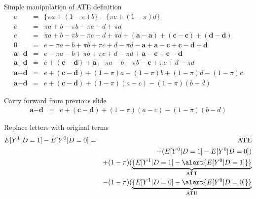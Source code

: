 \documentclass{beamer}
\begin{document}
\begin{frame}[plain]

  \begin{block}{Simple manipulation of ATE definition}
    \begin{eqnarray*}
      e&=&\{\pi{a} + (1-\pi)b\} - \{\pi{c} + (1-\pi)d\}  \\
      e&=&\pi{a} + b - \pi{b} - \pi{c} - d + \pi{d}  \\
      e&=&\pi{a} + b - \pi{b} - \pi{c} - d + \pi{d} + (\textbf{a} - \textbf{a}) + (\textbf{c} - \textbf{c}) + (\textbf{d} - \textbf{d})  \\
      0&=&e-\pi{a} - b + \pi{b} + \pi{c} + d - \pi{d} - \textbf{a} + \textbf{a} - \textbf{c} + \textbf{c} - \textbf{d} + \textbf{d}  \\
      \textbf{a}-\textbf{d}&=&e-\pi{a} - b + \pi{b} + \pi{c} + d - \pi{d}  + \textbf{a} - \textbf{c} + \textbf{c} - \textbf{d}  \\
      \textbf{a}-\textbf{d}&=&e  + (\textbf{c} - \textbf{d}) + \textbf{a}-\pi{a} - b + \pi{b} - \textbf{c} + \pi{c} + d - \pi{d} \\
      \textbf{a}-\textbf{d}&=&e  + (\textbf{c} - \textbf{d}) + (1-\pi)a -(1-\pi)b + (1-\pi)d - (1-\pi)c  \\
      \textbf{a}-\textbf{d}&=&e  + (\textbf{c} - \textbf{d}) + (1-\pi)(a-c) -(1-\pi)(b-d)
    \end{eqnarray*}
  \end{block}


\end{frame}

\begin{frame}[shrink=20,plain]
  \begin{block}{Carry forward from previous slide}
    \begin{eqnarray*}
      \textbf{a}-\textbf{d}&=&e  + (\textbf{c} - \textbf{d}) + (1-\pi)(a-c) -(1-\pi)(b-d)
    \end{eqnarray*}
  \end{block}

  \begin{block}{Replace letters with original terms }
    \begin{eqnarray*}
      E[Y^1|D=1] - E[Y^0|D=0] &=& \text{ATE}  \\
      &&+ (E[Y^0|D=1] - E[Y^0|D=0])  \\
      && + (1-\pi)( \underbrace{\{E[Y^1|D=1] - \alert{E[Y^0|D=1]}\}}_{ \mathclap{\text{ATT}}}  \\
      && - (1-\pi)( \underbrace{\{E[Y^1|D=0] - \alert{E[Y^0|D=0]}\}}_{ \mathclap{\text{ATU}}}  \\
    \end{eqnarray*}
  \end{block}
\end{frame}
\end{document}
